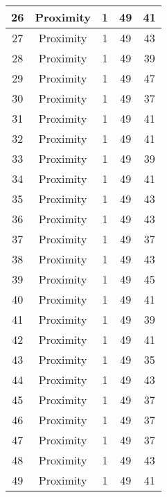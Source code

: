 \documentclass[results.tex]{subfiles}
\begin{document}
\begin{center}
\begin{tabular}{| c || c | c | c | c |}
    \hline
    26 & Proximity & 1 & 49 & 41 \\ 
    \hline
    27 & Proximity & 1 & 49 & 43 \\ 
    \hline
    28 & Proximity & 1 & 49 & 39 \\ 
    \hline
    29 & Proximity & 1 & 49 & 47 \\ 
    \hline
    30 & Proximity & 1 & 49 & 37 \\ 
    \hline
    31 & Proximity & 1 & 49 & 41 \\ 
    \hline
    32 & Proximity & 1 & 49 & 41 \\ 
    \hline
    33 & Proximity & 1 & 49 & 39 \\ 
    \hline
    34 & Proximity & 1 & 49 & 41 \\ 
    \hline
    35 & Proximity & 1 & 49 & 43 \\ 
    \hline
    36 & Proximity & 1 & 49 & 43 \\ 
    \hline
    37 & Proximity & 1 & 49 & 37 \\ 
    \hline
    38 & Proximity & 1 & 49 & 43 \\ 
    \hline
    39 & Proximity & 1 & 49 & 45 \\ 
    \hline
    40 & Proximity & 1 & 49 & 41 \\ 
    \hline
    41 & Proximity & 1 & 49 & 39 \\ 
    \hline
    42 & Proximity & 1 & 49 & 41 \\ 
    \hline
    43 & Proximity & 1 & 49 & 35 \\ 
    \hline
    44 & Proximity & 1 & 49 & 43 \\ 
    \hline
    45 & Proximity & 1 & 49 & 37 \\ 
    \hline
    46 & Proximity & 1 & 49 & 37 \\ 
    \hline
    47 & Proximity & 1 & 49 & 37 \\ 
    \hline
    48 & Proximity & 1 & 49 & 43 \\ 
    \hline
    49 & Proximity & 1 & 49 & 41 \\ 
    \hline   \end{tabular}
\end{center}
\end{document}
